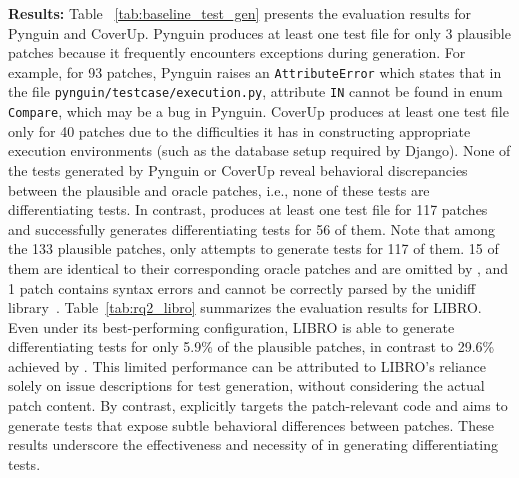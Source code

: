 \noindent \textbf{Results:}
Table ~\ref{tab:baseline_test_gen} presents the evaluation results for Pynguin and CoverUp.
Pynguin produces at least one test file for only 3 plausible patches 
because it frequently encounters exceptions during generation.
For example, for 93 patches, Pynguin raises an \verb|AttributeError| which states that in the file \verb|pynguin/testcase/execution.py|, attribute \verb|IN| cannot be found in enum \verb|Compare|, which may be a bug in Pynguin. %
CoverUp produces at least one test file only for 40 patches due to the difficulties it has in constructing appropriate execution environments (such as the database setup required by Django).
None of the tests generated by Pynguin or CoverUp reveal behavioral discrepancies between the plausible and oracle patches, i.e., none of these tests are differentiating tests.
In contrast, \appname produces at least one test file for 117 patches and successfully generates differentiating tests for 56 of them.
Note that among the 133 plausible patches, \appname only attempts to generate tests for 117 of them.
15 of them are identical to their corresponding oracle patches and are omitted by \appname, and 1 patch contains syntax errors and cannot be correctly parsed by the unidiff library~\cite{unidiff}.
Table~\ref{tab:rq2_libro} summarizes the evaluation results for LIBRO.
Even under its best-performing configuration, LIBRO is able to generate differentiating tests for only 5.9\% of the plausible patches, 
in contrast to 29.6\% achieved by \appname. 
This limited performance can be attributed to LIBRO’s reliance solely on issue descriptions for test generation, 
without considering the actual patch content. 
By contrast, \appname explicitly targets the patch-relevant code and aims to generate tests that expose subtle behavioral differences between patches. 
These results underscore the effectiveness and necessity of \appname in generating differentiating tests.





\vskip 1mm
\noindent {}


